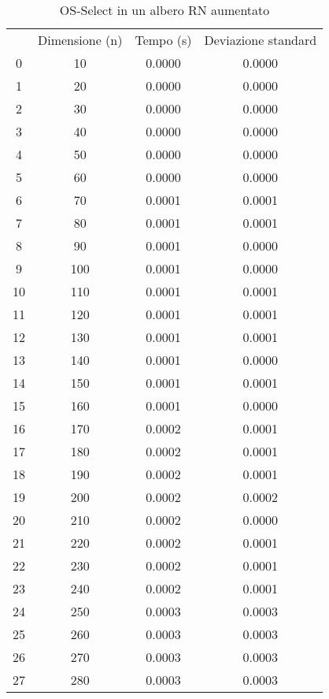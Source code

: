 \begin{table}
\centering
\caption{OS-Select in un albero RN aumentato}
\label{OS-Select in un albero RN aumentato}
\begin{adjustbox}{width=1\textwidth/2}
\begin{tabular}{|c|c|c|c|}
\hline
 & Dimensione (n) & Tempo (s) & Deviazione standard \\
0 & 10 & 0.0000 & 0.0000 \\
\cline{1-4}
1 & 20 & 0.0000 & 0.0000 \\
\cline{1-4}
2 & 30 & 0.0000 & 0.0000 \\
\cline{1-4}
3 & 40 & 0.0000 & 0.0000 \\
\cline{1-4}
4 & 50 & 0.0000 & 0.0000 \\
\cline{1-4}
5 & 60 & 0.0000 & 0.0000 \\
\cline{1-4}
6 & 70 & 0.0001 & 0.0001 \\
\cline{1-4}
7 & 80 & 0.0001 & 0.0001 \\
\cline{1-4}
8 & 90 & 0.0001 & 0.0000 \\
\cline{1-4}
9 & 100 & 0.0001 & 0.0000 \\
\cline{1-4}
10 & 110 & 0.0001 & 0.0001 \\
\cline{1-4}
11 & 120 & 0.0001 & 0.0001 \\
\cline{1-4}
12 & 130 & 0.0001 & 0.0001 \\
\cline{1-4}
13 & 140 & 0.0001 & 0.0000 \\
\cline{1-4}
14 & 150 & 0.0001 & 0.0001 \\
\cline{1-4}
15 & 160 & 0.0001 & 0.0000 \\
\cline{1-4}
16 & 170 & 0.0002 & 0.0001 \\
\cline{1-4}
17 & 180 & 0.0002 & 0.0001 \\
\cline{1-4}
18 & 190 & 0.0002 & 0.0001 \\
\cline{1-4}
19 & 200 & 0.0002 & 0.0002 \\
\cline{1-4}
20 & 210 & 0.0002 & 0.0000 \\
\cline{1-4}
21 & 220 & 0.0002 & 0.0001 \\
\cline{1-4}
22 & 230 & 0.0002 & 0.0001 \\
\cline{1-4}
23 & 240 & 0.0002 & 0.0001 \\
\cline{1-4}
24 & 250 & 0.0003 & 0.0003 \\
\cline{1-4}
25 & 260 & 0.0003 & 0.0003 \\
\cline{1-4}
26 & 270 & 0.0003 & 0.0003 \\
\cline{1-4}
27 & 280 & 0.0003 & 0.0003 \\

\end{tabular}
\end{adjustbox}
\end{table}
